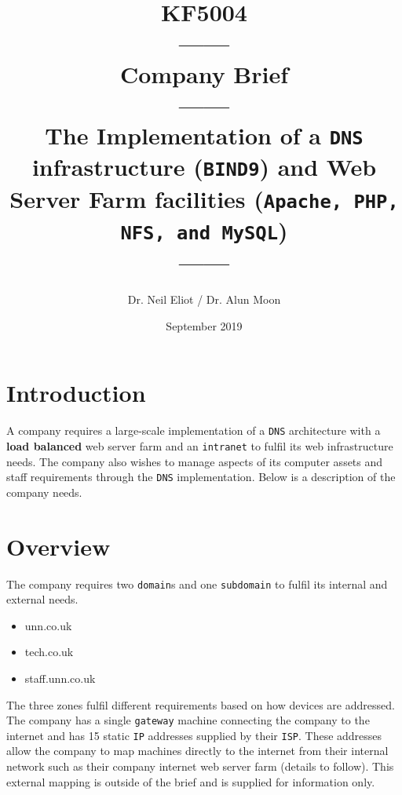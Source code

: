 \documentclass[11pt]{article}
\begin{document}
\author{Dr. Neil Eliot / Dr. Alun Moon}
\title{KF5004\\------\\Company Brief\\------\\The Implementation of a \texttt{DNS} infrastructure (\texttt{BIND9}) and Web Server Farm facilities
(\texttt{Apache, PHP, NFS, and MySQL})\\------}
\date{September 2019}
\maketitle

\newpage
\tableofcontents
\newpage

\section{Introduction}
A company requires a large-scale implementation of a \texttt{DNS} architecture with a \textbf{load balanced} web server farm and an \texttt{intranet} to fulfil its 
web infrastructure needs. The company also wishes to manage aspects of its computer assets and staff requirements through the \texttt{DNS} implementation. 
Below is a description of the company needs.

\section{Overview}

The company requires two \texttt{domain}s and one \texttt{subdomain} to fulfil its internal and external needs.

\begin{itemize}
    \item unn.co.uk
    \item tech.co.uk
    \item staff.unn.co.uk
\end{itemize}

\noindent The three zones fulfil different requirements based on how devices are addressed.\\

\noindent The company has a single \texttt{gateway} machine connecting the company to the internet and has 15 static \texttt{IP} addresses supplied 
by their \texttt{ISP}. 
These addresses allow the company to map machines directly to the internet from their internal network such as their company internet web server 
farm (details to follow). This external mapping is outside of the brief and is supplied for information only.\\\\
\end{document}

